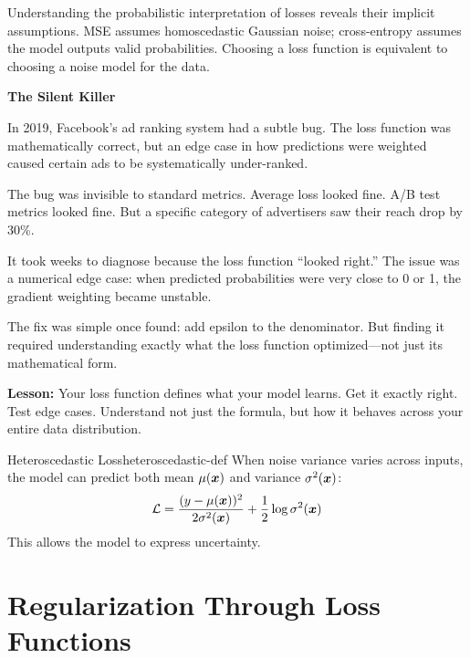 \documentclass[../../main.tex]{subfiles}
\begin{document}
\begin{keyconcept}
Understanding the probabilistic interpretation of losses reveals their implicit assumptions. MSE assumes homoscedastic Gaussian noise; cross-entropy assumes the model outputs valid probabilities. Choosing a loss function is equivalent to choosing a noise model for the data.
\end{keyconcept}

\begin{warstory}
\textbf{The Silent Killer}

In 2019, Facebook's ad ranking system had a subtle bug. The loss function was mathematically correct, but an edge case in how predictions were weighted caused certain ads to be systematically under-ranked.

The bug was invisible to standard metrics. Average loss looked fine. A/B test metrics looked fine. But a specific category of advertisers saw their reach drop by 30\%.

It took weeks to diagnose because the loss function ``looked right.'' The issue was a numerical edge case: when predicted probabilities were very close to 0 or 1, the gradient weighting became unstable.

The fix was simple once found: add epsilon to the denominator. But finding it required understanding exactly what the loss function optimized---not just its mathematical form.

\textbf{Lesson:} Your loss function defines what your model learns. Get it exactly right. Test edge cases. Understand not just the formula, but how it behaves across your entire data distribution.
\end{warstory}

\begin{definition}{Heteroscedastic Loss}{heteroscedastic-def}
When noise variance varies across inputs, the model can predict both mean $\mu(\boldsymbol{x})$ and variance $\sigma^2(\boldsymbol{x})$:
\[
    \mathcal{L} = \frac{(y - \mu(\boldsymbol{x}))^2}{2\sigma^2(\boldsymbol{x})} + \frac{1}{2}\log \sigma^2(\boldsymbol{x})
\]
This allows the model to express uncertainty.
\end{definition}

\section{Regularization Through Loss Functions}
\label{sec:loss-regularization}
\end{document}
